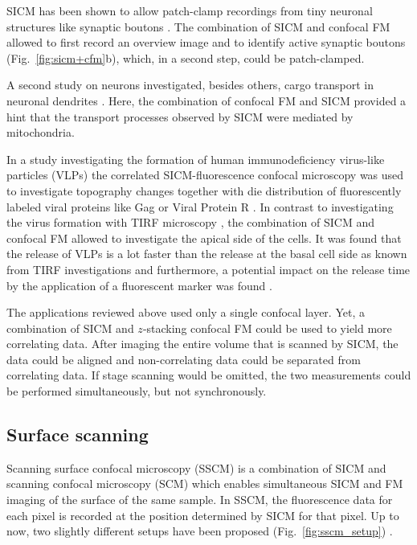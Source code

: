 SICM has been shown to allow patch-clamp recordings from tiny neuronal
structures like synaptic boutons \cite{Novak2013}. The combination of SICM and
confocal FM allowed to first record an overview image and to identify active
synaptic boutons (Fig.~\ref{fig:sicm+cfm}b), which, in a second step, could be
patch-clamped.

A second study on neurons investigated, besides others, cargo transport in
neuronal dendrites \cite{Takahashi2019}. Here, the combination of
confocal FM and SICM provided a hint that the transport processes observed by
SICM were mediated by mitochondria.


In a study investigating the formation of human immunodeficiency virus-like
particles (VLPs) the correlated SICM-fluorescence confocal microscopy was used
to investigate topography changes together with die distribution of
fluorescently labeled viral proteins like Gag or Viral Protein R
\cite{Bednarska2020}. In contrast to investigating the virus formation with
TIRF microscopy \cite{Jouvenet2008}, the combination of SICM and confocal FM
allowed to investigate the apical side of the cells. It was found that the
release of VLPs is a lot faster than the release at the basal cell side as
known from TIRF investigations and furthermore, a potential impact on the
release time by the application of a fluorescent marker was found
\cite{Bednarska2020}.

The applications reviewed above used only a single confocal layer. Yet,
a combination of SICM and $z$-stacking confocal FM could be used to yield more
correlating data. After imaging the entire volume that is scanned by SICM, the
data could be aligned and non-correlating data could be separated from
correlating data. If stage scanning would be omitted, the two measurements
could be performed simultaneously, but not synchronously.  


\subsection{Surface scanning}

Scanning surface confocal microscopy (SSCM) \cite{Gorelik2002a} is a
combination of SICM and scanning confocal microscopy (SCM) which enables
simultaneous SICM and FM imaging of the surface of the same sample. In SSCM,
the fluorescence data for each pixel is recorded at the position determined by
SICM for that pixel. Up to now, two slightly different setups have been proposed
(Fig.~\ref{fig:sscm_setup}) \cite{Gorelik2002a,Shevchuk2013}.

